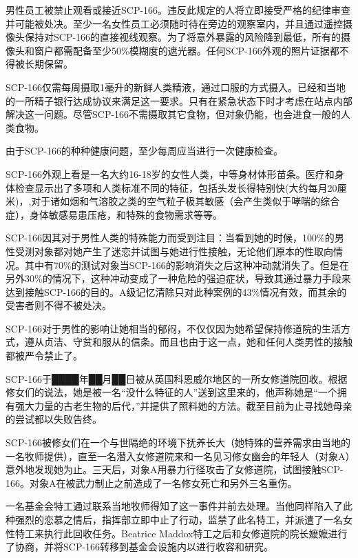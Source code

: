 男性员工被禁止观看或接近SCP-166。违反此规定的人将立即接受严格的纪律审查并可能被处决。至少一名女性员工必须随时待在旁边的观察室内，并且通过遥控摄像头保持对SCP-166的直接视线观察。为了将意外暴露的风险降到最低，所有的摄像头和窗户都需配备至少50\%模糊度的遮光器。任何SCP-166外观的照片证据都不得被长期保留。

SCP-166仅需每周摄取1毫升的新鲜人类精液，通过口服的方式摄入。已经和当地的一所精子银行达成协议来满足这一要求。只有在紧急状态下时才考虑在站点内部解决这一问题。尽管SCP-166不需摄取其它食物，但对象仍能，也会进食一般的人类食物。

由于SCP-166的种种健康问题，至少每周应当进行一次健康检查。

\hr

SCP-166外观上看是一名大约16-18岁的女性人类，中等身材体形苗条。医疗和身体检查显示出了多项和人类标准不同的特征，包括头发长得特别快(大约每月20厘米)，,对于诸如烟和气溶胶之类的空气粒子极其敏感（会产生类似于哮喘的综合症），身体敏感易患压疮，和特殊的食物需求等等。

SCP-166因其对于男性人类的特殊能力而受到注目：当看到她的时候，100\%的男性受测对象都对她产生了迷恋并试图与她进行性接触，无论他们原本的性取向情况。其中有70\%的测试对象当SCP-166的影响消失之后这种冲动就消失了。但是在另外30\%的情况下，这种冲动变成了一种危险的强迫症状，导致其通过暴力手段来达到接触SCP-166的目的。A级记忆清除只对此种案例的43\%情况有效，而其余的受害者则不得不被处决。

SCP-166对于男性的影响让她相当的郁闷，不仅仅因为她希望保持修道院的生活方式，遵从贞洁、守贫和服从的信条。而且也由于这一点，她和任何人类男性的接触都被严令禁止了。

\hr

SCP-166于████年██月██日被从英国科恩威尔地区的一所女修道院回收。根据修女们的说法，她是被一名“没什么特征的人”送到这里来的，他声称她是“一个拥有强大力量的古老生物的后代，”并提供了照料她的方法。截至目前为止寻找她母亲的尝试都以失败告终。

SCP-166被修女们在一个与世隔绝的环境下抚养长大（她特殊的营养需求由当地的一名牧师提供），直至一名潜入女修道院来和一名见习修女幽会的年轻人（对象A）意外地发现她为止。三天后，对象A用暴力行径攻击了女修道院，试图接触SCP-166。对象A在被武力制止之前造成了一名修女死亡和另外三名重伤。

一名基金会特工通过联系当地牧师得知了这一事件并前去处理。当他同样陷入了此种强烈的恋慕之情后，指挥部立即中止了行动，监禁了此名特工，并派遣了一名女性特工来执行此回收任务。Beatrice Maddox特工之后和女修道院的院长嬷嬷进行了协商，并将SCP-166转移到基金会设施内以进行收容和研究。

